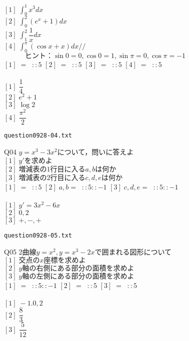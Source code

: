 \documentclass[11pt,dvipdfmx]{ujarticle}
\begin{document}
$[1]\;\displaystyle\int_{0}^{1} x^3 dx $\\
$[2]\;\displaystyle\int_{0}^{2} (e^{x}+1) dx $\\
$[3]\;\displaystyle\int_{1}^{2} \dfrac{1}{x} dx $\\
$[4]\;\displaystyle\int_{0}^{{\pi}} (\cos x +x) dx //$\\
$\text{　　　ヒント：}\sin 0 =0,\cos 0 =1,\sin {\pi} =0,\cos {\pi} =-1$\\
$[1]\;=\;\;::5$ 
$[2]\;=\;\;::5$ 
$[3]\;=\;\;::5$ 
$[4]\;=\;\;::5$ 
\\
\\
$[1]\;\dfrac{1}{4}$\\
$[2]\;e^{2}+1$\\
$[3]\;\log 2 $\\
$[4]\;\dfrac{{\pi}^2}{2}$\\
\newpage
\begin{center}
\verb|question0928-04.txt|\\
\end{center}
Q04 
$y=x^3-3x^2\text{について，問いに答えよ}$\\
$[1]\;y'\text{を求めよ}$\\
$[2]\;\text{増減表の}1\text{行目に入る}a,b\text{は何か}$\\
$[3]\;\text{増減表の}2\text{行目に入る}c,d,e\text{は何か}$\\
$[1]\;=\;\;::5$ 
$[2]\;a,b=\;\;::5::-1$ 
$[3]\;c,d,e=\;\;::5::-1$ 
\\
\\
$[1]\;y'=3x^2-6x$\\
$[2]\;0,2$\\
$[3]\;+,-,+$\\
\newpage
\begin{center}
\verb|question0928-05.txt|\\
\end{center}
Q05 
$2\text{曲線}y=x^{2},y=x^{3}-2x\text{で囲まれる図形について}$\\
$[1]\;\text{交点の}x\text{座標を求めよ}$\\
$[2]\;y\text{軸の右側にある部分の面積を求めよ}$\\
$[3]\;y\text{軸の左側にある部分の面積を求めよ}$\\
$[1]\;=\;\;::5::-1$ 
$[2]\;=\;\;::5$ 
$[3]\;=\;\;::5$ 
\\
\\
$[1]\;-1.0,2$\\
$[2]\;\dfrac{8}{3}$\\
$[3]\;\dfrac{5}{12}$\\
\newpage
\end{document}

